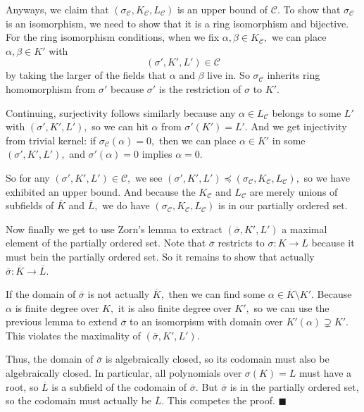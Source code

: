 Anyways, we claim that $(\sigma_\mathcal C,K_\mathcal C,L_\mathcal C)$ is an upper bound of $\mathcal C.$ To show that $\sigma_\mathcal C$ is an isomorphism, we need to show that it is a ring isomorphism and bijective. For the ring isomorphism conditions, when we fix $\alpha,\beta\in K_\mathcal C,$ we can place $\alpha,\beta\in K'$ with 
\[(\sigma',K',L')\in\mathcal C\]
by taking the larger of the fields that $\alpha$ and $\beta$ live in. So $\sigma_\mathcal C$ inherits ring homomorphism from $\sigma'$ because $\sigma'$ is the restriction of $\sigma$ to $K'.$

Continuing, surjectivity follows similarly because any $\alpha\in L_\mathcal C$ belongs to some $L'$ with $(\sigma',K',L'),$ so we can hit $\alpha$ from $\sigma'(K')=L'.$ And we get injectivity from trivial kernel: if $\sigma_\mathcal C(\alpha)=0,$ then we can place $\alpha\in K'$ in some $(\sigma',K',L'),$ and $\sigma'(\alpha)=0$ implies $\alpha=0.$

So for any $(\sigma',K',L')\in\mathcal C,$ we see $(\sigma',K',L')\preceq(\sigma_\mathcal C,K_\mathcal C,L_\mathcal C),$ so we have exhibited an upper bound. And because the $K_\mathcal C$ and $L_\mathcal C$ are merely unions of subfields of $\overline K$ and $\overline L,$ we do have $(\sigma_\mathcal C,K_\mathcal C,L_\mathcal C)$ is in our partially ordered set.

Now finally we get to use Zorn's lemma to extract $(\overline\sigma,K',L')$ a maximal element of the partially ordered set. Note that $\overline\sigma$ restricts to $\sigma:K\to L$ because it must bein the partially ordered set. So it remains to show that actually $\overline\sigma:\overline K\to\overline L.$

If the domain of $\overline\sigma$ is not actually $\overline K,$ then we can find some $\alpha\in\overline K\setminus K'.$ Because $\alpha$ is finite degree over $K,$ it is also finite degree over $K',$ so we can use the previous lemma to extend $\overline\sigma$ to an isomorpism with domain over $K'(\alpha)\supsetneq K'.$ This violates the maximality of $(\overline\sigma,K',L').$

Thus, the domain of $\overline\sigma$ is algebraically closed, so its codomain must also be algebraically closed. In particular, all polynomials over $\sigma(K)=L$ must have a root, so $\overline L$ is a subfield of the codomain of $\overline\sigma.$ But $\overline\sigma$ is in the partially ordered set, so the codomain must actually be $\overline L.$ This competes the proof. $\blacksquare$

